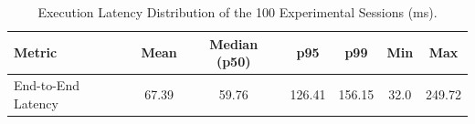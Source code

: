 \begin{table}[!htbp]
\renewcommand{\arraystretch}{1.05}
\centering
\small
\caption{Execution Latency Distribution of the 100 Experimental Sessions (ms).}
\label{tab:session_latency}
\vspace{4pt}
\begin{tabular}{l c c c c c c}
\hline
Metric & Mean & Median (p50) & p95 & p99 & Min & Max \\
\hline
End-to-End Latency & 67.39 & 59.76 & 126.41 & 156.15 & 32.0 & 249.72 \\
\hline
\end{tabular}
\end{table}
